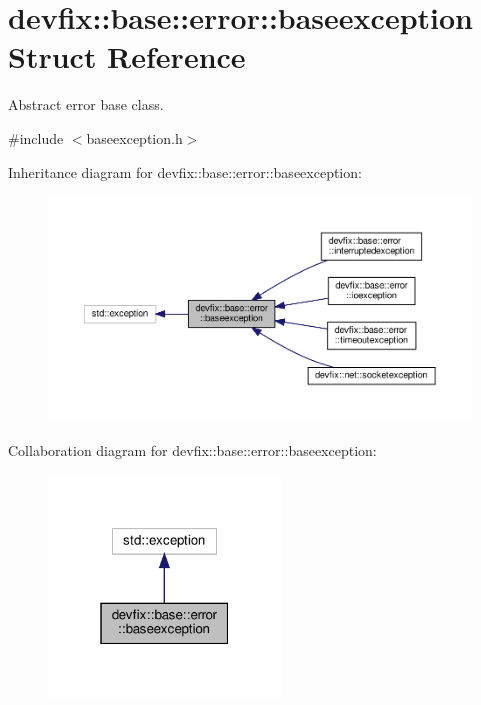 \hypertarget{structdevfix_1_1base_1_1error_1_1baseexception}{}\section{devfix\+:\+:base\+:\+:error\+:\+:baseexception Struct Reference}
\label{structdevfix_1_1base_1_1error_1_1baseexception}


Abstract error base class.  




{\ttfamily \#include $<$baseexception.\+h$>$}



Inheritance diagram for devfix\+:\+:base\+:\+:error\+:\+:baseexception\+:
\nopagebreak
\begin{figure}[H]
\begin{center}
\leavevmode
\includegraphics[width=350pt]{structdevfix_1_1base_1_1error_1_1baseexception__inherit__graph}
\end{center}
\end{figure}


Collaboration diagram for devfix\+:\+:base\+:\+:error\+:\+:baseexception\+:
\nopagebreak
\begin{figure}[H]
\begin{center}
\leavevmode
\includegraphics[width=175pt]{structdevfix_1_1base_1_1error_1_1baseexception__coll__graph}
\end{center}
\end{figure}
